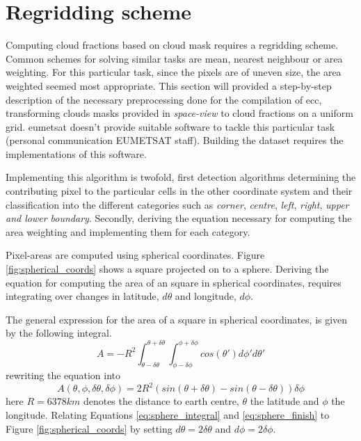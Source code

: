 \section{Regridding scheme} \label{sec:remapping}

Computing cloud fractions based on cloud mask requires a regridding scheme. Common schemes for solving similar tasks are mean, nearest neighbour or area weighting. For this particular task, since the pixels are of uneven size, the area weighted seemed most appropriate. This section will provided a step-by-step description of the necessary preprocessing done for the compilation of \acrshort{ecc}, transforming clouds masks provided in \textit{space-view} to cloud fractions on a uniform grid. \acrshort{eumetsat} doesn't provide suitable software to tackle this particular task (personal communication EUMETSAT staff). Building the dataset requires the implementations of this software.

Implementing this algorithm is twofold, first detection algorithms determining the contributing pixel to the particular cells in the other coordinate system and their classification into the different categories such as \textit{corner}, \textit{centre}, \textit{left}, \textit{right}, \textit{upper and lower boundary}.
Secondly,  deriving the equation necessary for computing the area weighting and implementing them for each category. 

Pixel-areas are computed using spherical coordinates. Figure \ref{fig:spherical_coords} shows a square projected on to a sphere. Deriving the equation for computing the area of an square in spherical coordinates, requires integrating over changes in latitude, $d\theta$ and longitude, $d\phi$. 

The general expression for the area of a square in spherical coordinates, is given by the following integral. 
\begin{equation} \label{eq:sphere_integral}
    A = -R^2\int_{ \theta - \delta \theta }^{\theta + \delta \theta} \int_{ \phi - \delta \phi }^{\phi + \delta \phi} cos\left( \theta' \right) d\phi' d\theta'
\end{equation}
rewriting the equation into
\begin{equation} \label{eq:sphere_finish}
    A \left( \theta, \phi, \delta \theta, \delta \phi   \right)= 2R^2 \left( sin\left( \theta + \delta \theta  \right) - sin\left(  \theta - \delta \theta  \right) \right) \delta \phi
\end{equation}
here $R=6378km$ denotes the distance to earth centre, $\theta$ the latitude and $\phi$ the longitude. Relating Equations \eqref{eq:sphere_integral} and \eqref{eq:sphere_finish} to Figure \ref{fig:spherical_coords} by setting $d \theta = 2 \delta \theta$ and $d \phi = 2 \delta \phi$.

